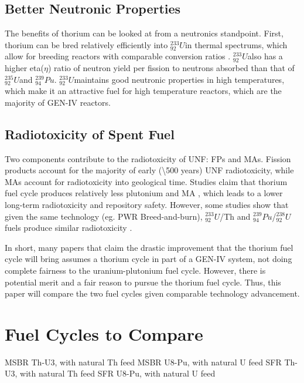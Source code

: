 \documentclass{article}
\newcommand{\uthree}{$^{233}_{92}U$}
\newcommand{\ufive}{$^{235}_{92}U$}%
\newcommand{\ueight}{$^{238}_{92}U$}
\newcommand{\pu}{$^{239}_{94}Pu$}
\begin{document}
\subsection{Better Neutronic Properties}
The benefits of thorium can be looked at from a neutronics standpoint.
First, thorium can be bred relatively efficiently into \uthree in thermal spectrums,
which allow for breeding reactors with comparable conversion ratios \cite{allibert_introduction_2015}.
\uthree also has a higher eta($\eta$) ratio of neutron yield per fission to 
neutrons absorbed than that of \ufive and \pu \cite{lung_perspectives_1998}.
\uthree maintains good neutronic properties in high temperatures,
which make it an attractive fuel for high temperature reactors, which
are the majority of GEN-IV reactors.

\subsection{Radiotoxicity of Spent Fuel}
Two components contribute to the radiotoxicity of 
\gls{UNF}: \glspl{FP} and \glspl{MA}.
Fission products account for the majority of early (\textbackslash 500 years)
\gls{UNF} radiotoxicity, while \glspl{MA} account for 
radiotoxicity into geological time.
Studies claim that thorium fuel cycle produces relatively
less plutonium and \gls{MA} \cite{boczar_thorium_2002} \cite{david_revisiting_2007},
which leads to a lower long-term radiotoxicity and repository safety.
However, some studies show that given the same technology (eg. \gls{PWR} Breed-and-burn),
\uthree/Th and \pu/\ueight fuels produce similar radiotoxicity \cite{croff_comparative_2016}.

In short, many papers that claim the drastic improvement that the thorium
fuel cycle will bring assumes a thorium cycle in part of a GEN-IV system,
not doing complete fairness to the uranium-plutonium fuel cycle. However,
there is potential merit and a fair reason to pursue the thorium fuel cycle.
Thus, this paper will compare the two fuel cycles given comparable technology
advancement. 




%

\section{Fuel Cycles to Compare}

MSBR Th-U3, with natural Th feed \cite{robertson_conceptual_1971}
MSBR U8-Pu, with natural U feed
SFR Th-U3, with natural Th feed
SFR U8-Pu, with natural U feed



\end{document}
